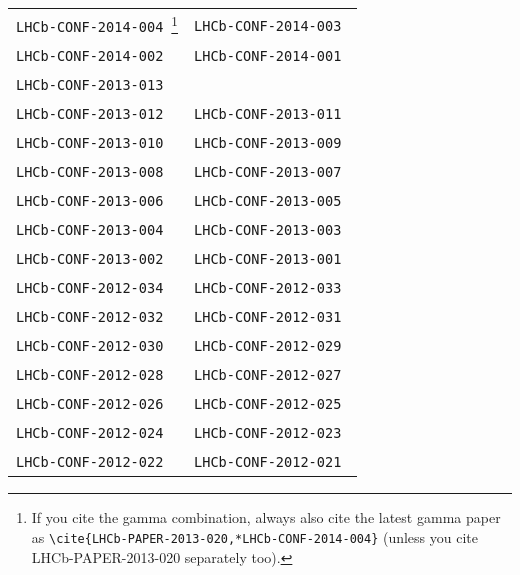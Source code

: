 \begin{center}
\begin{longtable}{ll}
\hline
\texttt{LHCb-CONF-2014-004}~\cite{LHCb-CONF-2014-004}\footnote{If you cite 
the gamma combination, always also cite the latest gamma paper as
\texttt{\textbackslash{}cite\{LHCb-PAPER-2013-020,*LHCb-CONF-2014-004\}}
(unless you cite LHCb-PAPER-2013-020 separately too).} &
\texttt{LHCb-CONF-2014-003}~\cite{LHCb-CONF-2014-003} \\
\texttt{LHCb-CONF-2014-002}~\cite{LHCb-CONF-2014-002} &
\texttt{LHCb-CONF-2014-001}~\cite{LHCb-CONF-2014-001} \\
\hline
\texttt{LHCb-CONF-2013-013}~\cite{LHCb-CONF-2013-013} \\
\texttt{LHCb-CONF-2013-012}~\cite{LHCb-CONF-2013-012} &
\texttt{LHCb-CONF-2013-011}~\cite{LHCb-CONF-2013-011} \\
\texttt{LHCb-CONF-2013-010}~\cite{LHCb-CONF-2013-010} &
\texttt{LHCb-CONF-2013-009}~\cite{LHCb-CONF-2013-009} \\
\texttt{LHCb-CONF-2013-008}~\cite{LHCb-CONF-2013-008} &
\texttt{LHCb-CONF-2013-007}~\cite{LHCb-CONF-2013-007} \\
\texttt{LHCb-CONF-2013-006}~\cite{LHCb-CONF-2013-006} &
\texttt{LHCb-CONF-2013-005}~\cite{LHCb-CONF-2013-005} \\
\texttt{LHCb-CONF-2013-004}~\cite{LHCb-CONF-2013-004} &
\texttt{LHCb-CONF-2013-003}~\cite{LHCb-CONF-2013-003} \\
\texttt{LHCb-CONF-2013-002}~\cite{LHCb-CONF-2013-002} &
\texttt{LHCb-CONF-2013-001}~\cite{LHCb-CONF-2013-001} \\
\hline
\texttt{LHCb-CONF-2012-034}~\cite{LHCb-CONF-2012-034} & 
\texttt{LHCb-CONF-2012-033}~\cite{LHCb-CONF-2012-033} \\
\texttt{LHCb-CONF-2012-032}~\cite{LHCb-CONF-2012-032} & 
\texttt{LHCb-CONF-2012-031}~\cite{LHCb-CONF-2012-031} \\
\texttt{LHCb-CONF-2012-030}~\cite{LHCb-CONF-2012-030} & 
\texttt{LHCb-CONF-2012-029}~\cite{LHCb-CONF-2012-029} \\
\texttt{LHCb-CONF-2012-028}~\cite{LHCb-CONF-2012-028} & 
\texttt{LHCb-CONF-2012-027}~\cite{LHCb-CONF-2012-027} \\
\texttt{LHCb-CONF-2012-026}~\cite{LHCb-CONF-2012-026} & 
\texttt{LHCb-CONF-2012-025}~\cite{LHCb-CONF-2012-025} \\
\texttt{LHCb-CONF-2012-024}~\cite{LHCb-CONF-2012-024} & 
\texttt{LHCb-CONF-2012-023}~\cite{LHCb-CONF-2012-023} \\
\texttt{LHCb-CONF-2012-022}~\cite{LHCb-CONF-2012-022} & 
\texttt{LHCb-CONF-2012-021}~\cite{LHCb-CONF-2012-021} \\

\end{longtable}
\end{center}
